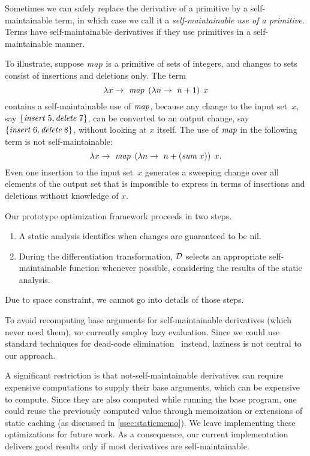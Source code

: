 \begin{oldSec}
Sometimes we can safely replace the derivative of a primitive by
a self-maintainable term, in which case we call it a
\emph{self-maintainable use of a primitive.}
Terms have self-maintainable derivatives if they use
primitives in a self-maintainable manner.

%
To illustrate, suppose $\mathit{map}$ is a primitive of sets of
integers,
and changes to sets consist of insertions and deletions only.
The term
\[
\Lam x {\MapT {\Lam*n {n + 1}} x}
\]
contains a self-maintainable use of $\mathit{map}$, because any change to
the input set~$x$, say $\{\App\INSERT5, \App\DELETE7\}$, can be
converted to an output change, say $\{\App\INSERT6,
\App\DELETE8\}$, without looking at $x$ itself. The use of $\mathit{map}$
in the following term is not self-maintainable:
\[
\Lam x {\MapT {\Lam*n {n + \Sum* x}} x}.
\]
Even one insertion to the input set~$x$ generates a sweeping
change over all elements of the output set that is impossible to
express in terms of insertions and deletions without knowledge of $x$.

Our prototype optimization framework proceeds in two steps.
\begin{enumerate}
\item A static analysis identifies when changes are guaranteed to be nil.
\item During the differentiation transformation, $\mathcal{D}$
selects an appropriate self-maintainable function whenever possible,
considering the results of the static analysis.
\end{enumerate}
Due to space constraint, we cannot go into details of those
steps.
%
%
\end{oldSec}

To avoid recomputing base arguments for self-maintainable derivatives
(which never need them), we
currently employ lazy evaluation.  Since we could use standard techniques for dead-code
elimination~\citep{Appel97} instead, laziness is not central to our
approach.

A significant restriction is that not-self-maintainable derivatives can require expensive computations to supply their base
arguments, which can be expensive to compute. Since they are also
computed while running the base program, one could reuse the previously
computed value through memoization or extensions of static
caching (as discussed in \cref{ssec:staticmemo}). We leave implementing these optimizations for future work. As a consequence,
our current implementation delivers good results only if
most derivatives are self-maintainable.

